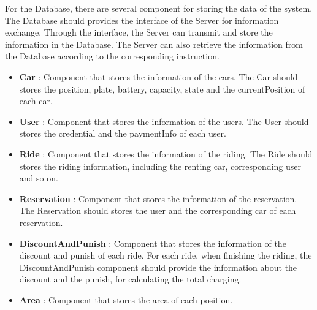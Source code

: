 \documentclass{article}
\begin{document}
	For the Database, there are several component for storing the data of the system. The Database should provides the interface of the Server for information exchange. Through the interface, the Server can transmit and  store the information in the Database. The Server can also retrieve the information from the Database according to the corresponding instruction.

	\begin{itemize}
		\item \textbf{Car} : Component that stores the information of the cars. The Car should stores the position, plate, battery, capacity, 	state and the currentPosition of each car.
		\item \textbf{User} : Component that stores the information of the users. The User should stores the credential and the paymentInfo of each user.
		\item \textbf{Ride} : Component that stores the information of the riding. The Ride should stores the riding information, including the renting car, corresponding user and so on.
		\item \textbf{Reservation} : Component that stores the information of the reservation. The Reservation should stores the user and the corresponding car of each reservation.
		\item \textbf{DiscountAndPunish} : Component that stores the information of the discount and punish of each ride. For each ride, when finishing the riding, the DiscountAndPunish component should provide the information about the discount and the punish, for calculating the total charging.
		\item \textbf{Area} : Component that stores the area of each position.
	\end{itemize}
	\newpage
\end{document}
